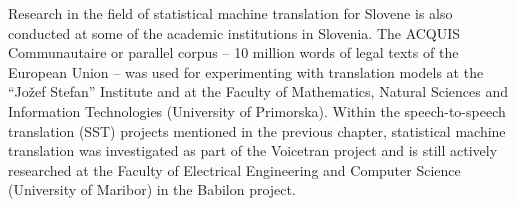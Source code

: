 \begin{multicols}{2}
Research in the field of statistical machine translation for Slovene is also conducted at some of the academic institutions in Slovenia. The ACQUIS Communautaire \cite{ET1} or parallel corpus – 10 million words of legal texts of the European Union – was used for experimenting with translation models at the “Jožef Stefan” Institute and at the Faculty of Mathematics, Natural Sciences and Information Technologies (University of Primorska). Within the speech-to-speech translation (SST) projects mentioned in the previous chapter, statistical machine translation was investigated as part of the Voicetran project and is still actively researched at the Faculty of Electrical Engineering and Computer Science (University of Maribor) in the Babilon project. 


\end{multicols}
